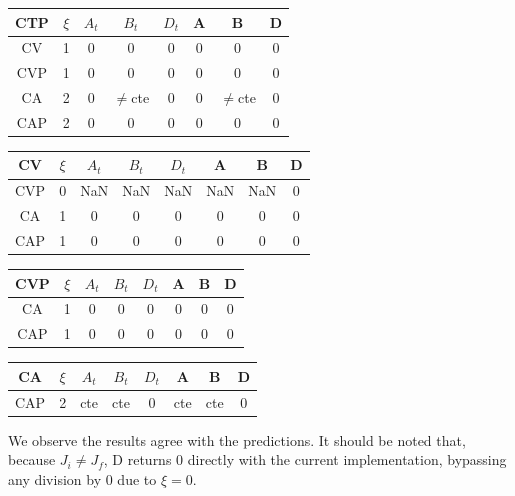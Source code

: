 \documentclass[twocolumn]{article}
\begin{document}
\begin{table}[H]
	\begin{tabular}{|c|c|c|c|c|c|c|c|}
		\hline
		CTP & $\xi $& $A_t$ & $B_t$ & $D_t$ & A & B & D \\
		\hline
		CV & 1 & 0 & 0 & 0 & 0 & 0 & 0\\
		\hline
		CVP & 1 & 0 & 0 & 0 & 0 & 0 & 0\\
		\hline
		CA & 2 & 0 & $\neq$cte & 0 & 0 & $\neq$cte & 0\\
		\hline
		CAP & 2 & 0 & 0 & 0 & 0 & 0 & 0\\
		\hline
	\end{tabular}
\end{table}

\begin{table}[H]
	\begin{tabular}{|c|c|c|c|c|c|c|c|}
		\hline
		CV & $\xi $& $A_t$ & $B_t$ & $D_t$ & A & B & D \\
		\hline
		CVP & 0 & NaN & NaN & NaN & NaN & NaN & 0\\
		\hline
		CA & 1 & 0 & 0 & 0 & 0 & 0 & 0\\
		\hline
		CAP & 1 & 0 & 0 & 0 & 0 & 0 & 0\\
		\hline
	\end{tabular}
\end{table}


\begin{table}[H]
	\begin{tabular}{|c|c|c|c|c|c|c|c|}
		\hline
		CVP & $\xi $& $A_t$ & $B_t$ & $D_t$ & A & B & D \\
		\hline
		CA & 1 & 0 & 0 & 0 & 0 & 0 & 0\\
		\hline
		CAP & 1 & 0 & 0 & 0 & 0 & 0 & 0\\
		\hline
	\end{tabular}
\end{table}

\begin{table}[H]
	\begin{tabular}{|c|c|c|c|c|c|c|c|}
		\hline
		CA & $\xi $& $A_t$ & $B_t$ & $D_t$ & A & B & D \\
		\hline
		CAP & 2 & cte & cte & 0 & cte & cte & 0\\
		\hline
	\end{tabular}
\end{table}

We observe the results agree with the predictions. It should be noted that, because $J_i \neq J_f$, D returns 0 directly with the current implementation, bypassing any division by 0 due to $\xi = 0$. 
\end{document}
